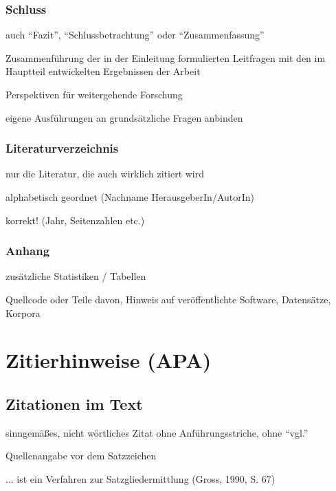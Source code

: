 \documentclass[a4paper,oneside,DIV8,10pt]{scrartcl}
\newcommand{\zit}[1]{%
\fontfamily{phv}\selectfont #1\normalfont}
\begin{document}
    \subsubsection{Schluss}
        \begin{compactitem}
            \item auch \enquote{Fazit}, \enquote{Schlussbetrachtung} oder 
            \enquote{Zusammenfassung}
            \item Zusammenführung der in der Einleitung formulierten 
            Leitfragen mit den im Hauptteil entwickelten Ergebnissen der Arbeit
            \item Perspektiven für weitergehende Forschung
            \item eigene Ausführungen an grundsätzliche Fragen anbinden
        \end{compactitem}

    \subsubsection{Literaturverzeichnis}
        \begin{compactitem}
            \item nur die Literatur, die auch wirklich zitiert wird
            \item alphabetisch geordnet (Nachname HerausgeberIn/AutorIn)
            \item korrekt! (Jahr, Seitenzahlen etc.)
        \end{compactitem}

    
    \subsubsection{Anhang}
        \begin{compactitem}
            \item zusätzliche Statistiken / Tabellen
            \item Quellcode oder Teile davon, Hinweis auf veröffentlichte 
            Software, Datensätze, Korpora
        \end{compactitem}
        
\section{Zitierhinweise (APA)}

    \subsection{Zitationen im Text}
        \begin{compactitem}
            \item sinngemäßes, nicht wörtliches Zitat ohne 
            Anführungsstriche, ohne \enquote{vgl.}
            \item Quellenangabe vor dem Satzzeichen
        \end{compactitem}
        \zit{... ist ein Verfahren zur Satzgliedermittlung (Gross, 1990, S. 67)}
    
\end{document}
